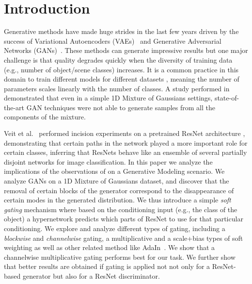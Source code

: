 \section{Introduction}
Generative methods have made huge strides in the last few years driven by the success of Variational Autoencoders (VAEs)~\cite{kingma2013auto} and Generative Adversarial Networks (GANs)~\cite{goodfellow2014generative}. 
These methods can generate impressive results but one major challenge is that quality degrades quickly when the diversity of training data (e.g., number of object/scene classes) increases. 
It is a common practice in this domain to train different models for different datasets \cite{goodfellow2014generative,isola2016image2image,progressiveGAN,zhu2017toward,zhu2017unpaired,...,...,...}, meaning the number of parameters scales linearly with the number of classes. 
A study performed in \cite{ghosh2017multi} demonstrated that even in a simple 1D Mixture of Gaussians settings, state-of-the-art GAN techniques were not able to generate samples from all the components of the mixture. 

%
Veit et al.~\cite{veit2016residual} performed incision experiments on a pretrained ResNet architecture \cite{he2016deep}, demonstrating that certain paths in the network played a more important role for certain classes, inferring that ResNets behave like an ensemble of several partially disjoint networks for image classification. 
In this paper we analyze the implications of the observations of \cite{veit2016residual} on a Generative Modeling scenario. 
We analyze GANs on a 1D Mixture of Gaussians dataset, and discover that the removal of certain blocks of the generator correspond to the disappearance of certain modes in the generated distribution.
We thus introduce a simple {\em soft gating} mechanism where based on the conditioning input (e.g., the class of the object) a hypernetwork predicts which parts of ResNet to use for that particular conditioning.
We explore and analyze different types of gating, including a {\em blockwise} and {\em channelwise} gating, a multiplicative and a scale+bias types of soft weighting as well as other related method like AdaIn~\cite{huang2017arbitrary,huang2018multimodal}. We show that a channelwise multiplicative gating performs best for our task. We further show that better results are obtained if gating is applied not not only for a ResNet-based generator but also for a ResNet discriminator.
%

